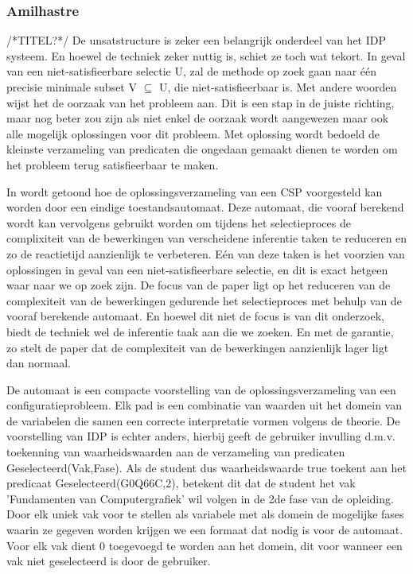 \subsubsection{Amilhastre} /*TITEL?*/
De unsatstructure is zeker een belangrijk onderdeel van het IDP systeem. En hoewel de techniek zeker nuttig is, schiet ze toch wat tekort. In geval van een niet-satisfieerbare selectie U, zal de methode op zoek gaan naar \'{e}\'{e}n precisie minimale subset V $\subseteq$ U, die niet-satisfieerbaar is. Met andere woorden wijst het de oorzaak van het probleem aan. Dit is een stap in de juiste richting, maar nog beter zou zijn als niet enkel de oorzaak wordt aangewezen maar ook alle mogelijk oplossingen voor dit probleem. Met oplossing wordt bedoeld de kleinste verzameling van predicaten die ongedaan gemaakt dienen te worden om het probleem terug satisfieerbaar te maken. 

In \citep{amilhastre2002consistency} wordt getoond hoe de oplossingsverzameling van een CSP voorgesteld kan worden door een eindige toestandsautomaat. Deze automaat, die vooraf berekend wordt kan vervolgens gebruikt worden om tijdens het selectieproces de complixiteit van de bewerkingen van verscheidene inferentie taken te reduceren en zo de reactietijd aanzienlijk te verbeteren. E\'{e}n van deze taken is het voorzien van oplossingen in geval van een niet-satisfieerbare selectie, en dit is exact hetgeen waar naar we op zoek zijn. De focus van de paper ligt op het reduceren van de complexiteit van de bewerkingen gedurende het selectieproces met behulp van de vooraf berekende automaat. En hoewel dit niet de focus is van dit onderzoek, biedt de techniek wel de inferentie taak aan die we zoeken. En met de garantie, zo stelt de paper dat de complexiteit van de bewerkingen aanzienlijk lager ligt dan normaal. 

De automaat is een compacte voorstelling van de oplossingsverzameling van een configuratieprobleem. Elk pad is een combinatie van waarden uit het domein van de variabelen die samen een correcte interpretatie vormen volgens de theorie. De voorstelling van IDP is echter anders, hierbij geeft de gebruiker invulling d.m.v. toekenning van waarheidswaarden aan de verzameling van predicaten Geselecteerd(Vak,Fase). Als de student dus waarheidswaarde true toekent aan het predicaat Geselecteerd(G0Q66C,2), betekent dit dat de student het vak 'Fundamenten van Computergrafiek' wil volgen in de 2de fase van de opleiding. Door elk uniek vak voor te stellen als variabele met als domein de mogelijke fases waarin ze gegeven worden krijgen we een formaat dat nodig is voor de automaat. Voor elk vak dient 0 toegevoegd te worden aan het domein, dit voor wanneer een vak niet geselecteerd is door de gebruiker.

